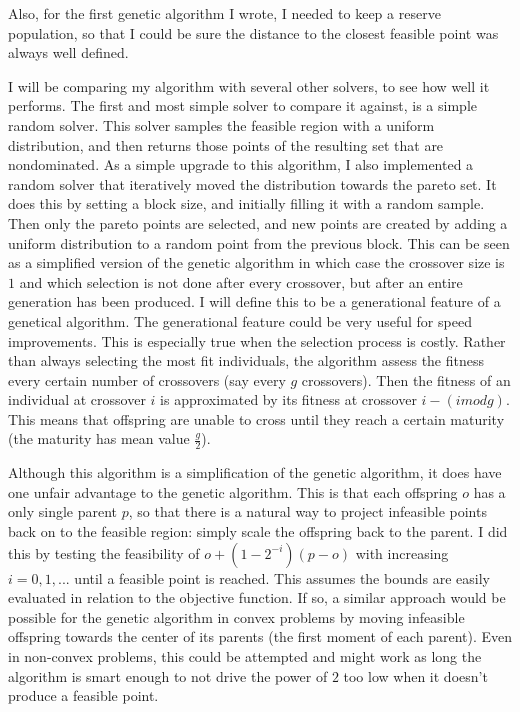 \documentclass{article}
\begin{document}
{{Also, for the first genetic algorithm I wrote, I needed to keep a reserve population, so that I could be sure the 
distance to the closest feasible point was always well defined.

I will be comparing my algorithm with several other solvers, to see how well it performs.
The first and most simple solver to compare it against, is a simple random solver.
This solver samples the feasible region with a uniform distribution, and then returns those points of the resulting set that are nondominated.
As a simple upgrade to this algorithm, I also implemented a random solver that iteratively moved the distribution towards the pareto set.
It does this by setting a block size, and initially filling it with a random sample.
Then only the pareto points are selected, and new points are created by adding a uniform distribution to a random point from the previous block.
This can be seen as a simplified version of the genetic algorithm in which case the crossover size is $1$ and which selection is not done after every crossover, 
but after an entire generation has been produced.
I will define this to be a generational feature of a genetical algorithm.
The generational feature could be very useful for speed improvements.
This is especially true when the selection process is costly.
Rather than always selecting the most fit individuals, the algorithm assess the fitness every certain number of crossovers (say every $g$ crossovers).
Then the fitness of an individual at crossover $i$ is approximated by its fitness at crossover $i - (i mod g)$.
This means that offspring are unable to cross until they reach a certain maturity (the maturity has mean value $\frac g 2$).

Although this algorithm is a simplification of the genetic algorithm, it does have one unfair advantage to the genetic algorithm.
This is that each offspring $o$ has a only single parent $p$, so that there is a natural way to project infeasible points back on to the feasible region: simply scale the offspring back to the parent.
I did this by testing the feasibility of $o + (1 - 2^{-i})(p - o)$ with increasing $i=0,1,...$ until a feasible point is reached.
This assumes the bounds are easily evaluated in relation to the objective function.
If so, a similar approach would be possible for the genetic algorithm in convex problems by moving infeasible offspring towards
the center of its parents (the first moment of each parent).
Even in non-convex problems, this could be attempted and might work as long the algorithm is smart enough to not drive the power of $2$ too low when it doesn't produce a feasible point.

}}
\end{document}
